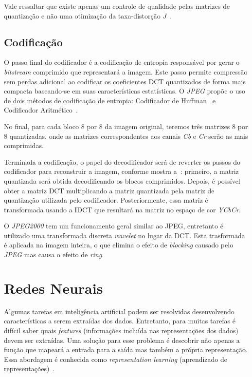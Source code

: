 Vale ressaltar que existe apenas um controle de qualidade pelas matrizes de quantização e não uma otimização da taxa-distorção $J$~.
\subsection{Codificação}
O passo final do codificador é a codificação de entropia responsável por gerar o \textit{bitstream} comprimido que representará a imagem. Este passo permite compressão sem perdas adicional ao codificar os coeficientes \acrshort{DCT} quantizados de forma mais compacta baseando-se em suas características estatísticas. O \textit{JPEG} propõe o uso de dois métodos de codificação de entropia: Codificador de Huffman~\cite{huffman1952method} e Codificador Aritmético~\cite{pennebaker1988arithmetic}. 

No final, para cada bloco 8 por 8 da imagem original, teremos três matrizes 8 por 8 quantizadas, onde as matrizes correspondentes aos canais \textit{Cb} e \textit{Cr} serão as mais comprimidas.

Terminada a codificação, o papel do decodificador será de reverter os passos do codificador para reconstruir a imagem, conforme mostra a~: primeiro, a matriz quantizada será obtida decodificando os blocos comprimidos. Depois, é possível obter a matriz \acrshort{DCT} multiplicando a matriz quantizada pela matriz de quantização utilizada pelo codificador. Posteriormente, essa matriz é transformada usando a \acrshort{IDCT} que resultará na matriz no espaço de cor \textit{YCbCr}.

O \textit{JPEG2000} tem um funcionamento geral similar ao JPEG, entretanto é utilizado uma transformada discreta \textit{wavelet} no lugar da \acrshort{DCT}. Esta trasformada é aplicada na imagem inteira, o que elimina o efeito de \textit{blocking} causado pelo \textit{JPEG} mas causa o efeito de \textit{ring}.
\section{Redes Neurais}
Algumas tarefas em inteligência artificial podem ser resolvidas desenvolvendo características a serem extraídas dos dados. Entretanto, para muitas tarefas é difícil saber quais \textit{features} (informações incluída nas representações dos dados) devem ser extraídas. Uma solução para esse problema é descobrir não apenas a função que mapeará a entrada para a saída mas também a própria representação. Essa abordagem é conhecida como \textit{representation learning} (aprendizado de representações)~\cite{deeplearning}.

